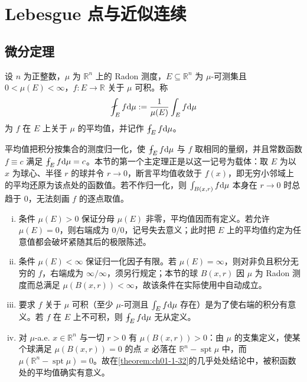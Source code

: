 \documentclass[../../main.tex]{subfiles}%
\begin{document}
\section{Lebesgue 点与近似连续}\label{section:ch01-07}

\subsection{微分定理}\label{subsection:ch01-07-1}

\begin{definition*}[平均值]\label{definition:ch01-07-平均}
设 $n$ 为正整数，$\mu$ 为 $\mathbb{R}^n$ 上的 Radon 测度，$E\subseteq\mathbb{R}^n$ 为 $\mu$-可测集且 $0<\mu(E)<\infty$，$f:E\to\mathbb{R}$ 关于 $\mu$ 可积。称
\begin{align*}
\fint_E f\diff\mu:=\frac{1}{\mu(E)}\int_E f\diff\mu
\end{align*}
为 $f$ 在 $E$ 上关于 $\mu$ 的平均值，并记作 $\fint_E f\diff\mu$。
\end{definition*}

\begin{remark}\label{remark:ch01-07-平均-动机}
平均值把积分按集合的测度归一化，使 $\fint_E f\diff\mu$ 与 $f$ 取相同的量纲，并且常数函数 $f\equiv c$ 满足 $\fint_E f\diff\mu=c$。本节的第一个主定理正是以这一记号为载体：取 $E$ 为以 $x$ 为球心、半径 $r$ 的球并令 $r\to0$，断言平均值收敛于 $f(x)$，即无穷小邻域上的平均还原为该点处的函数值。若不作归一化，则 $\int_{B(x,r)}f\mathrm{d}\mu$ 本身在 $r\to0$ 时总趋于 $0$，无法刻画 $f$ 的逐点取值。
\end{remark}

\begin{remark}\label{remark:ch01-07-平均-条件}
\begin{enumerate}[(i)]
\item 条件 $\mu(E)>0$ 保证分母 $\mu(E)$ 非零，平均值因而有定义。若允许 $\mu(E)=0$，则右端成为 $0/0$，记号失去意义；此时把 $E$ 上的平均值约定为任意值都会破坏紧随其后的极限陈述。
\item 条件 $\mu(E)<\infty$ 保证归一化因子有限。若 $\mu(E)=\infty$，则对非负且积分无穷的 $f$，右端成为 $\infty/\infty$，须另行规定；本节的球 $B(x,r)$ 因 $\mu$ 为 Radon 测度而总满足 $\mu(B(x,r))<\infty$，故该条件在实际使用中自动成立。
\item 要求 $f$ 关于 $\mu$ 可积（至少 $\mu$-可测且 $\int_E f\mathrm{d}\mu$ 存在）是为了使右端的积分有意义。若 $f$ 在 $E$ 上不可积，则 $\fint_E f\diff\mu$ 无从定义。
\item 对 $\mu$-a.e. $x\in\mathbb{R}^n$ 与一切 $r>0$ 有 $\mu(B(x,r))>0$：由 $\mu$ 的支集定义，使某个球满足 $\mu(B(x,r))=0$ 的点 $x$ 必落在 $\mathbb{R}^n-\operatorname{spt}\mu$ 中，而 $\mu(\mathbb{R}^n-\operatorname{spt}\mu)=0$。故在\cref{theorem:ch01-1-32}的几乎处处结论中，被积函数处的平均值确实有意义。%
\end{enumerate}
\end{remark}
\end{document}
